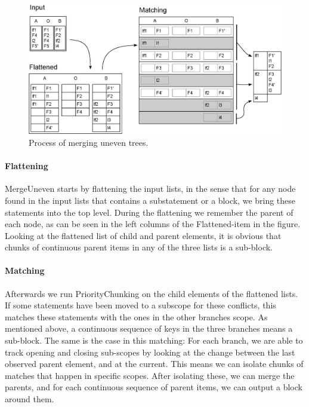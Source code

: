\documentclass[11pt]{article}
\begin{document}
\begin{figure}
   \centerline{\includegraphics[scale=0.55]{drawings/html/EditedFlattenedMerge.eps}}
   \caption{Process of merging uneven trees.}
   \label{UeventreeProcess}
\end{figure}

\paragraph{Flattening} MergeUneven starts by flattening the input lists, in the sense that for any node found in the input lists that contains a substatement or a block, we bring these statements into the top level. During the flattening we remember the parent of each node, as can be seen in the left columns of the Flattened-item in the figure. Looking at the flattened list of child and parent elements,  it is obvious that chunks of continuous parent items in any of the three lists is a sub-block.

\paragraph{Matching} Afterwards we run PriorityChunking on the child elements of the flattened lists. If some statements have been moved to a subscope for these conflicts, this matches these statements with the ones in the other branches scope. As mentioned above, a continuous sequence of keys in the three branches means a sub-block. The same is the case in this matching: For each branch, we are able to track opening and closing sub-scopes by looking at the change between the last observed parent element, and at the current. This means we can isolate chunks of matches that happen in specific scopes. After isolating these, we can merge the parents, and for each continuous sequence of parent items, we can output a block around them.
\end{document}
